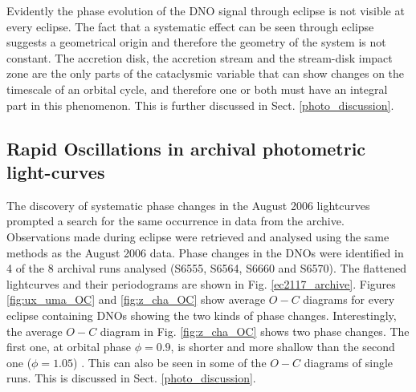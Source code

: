 
























Evidently the phase evolution of the DNO signal through eclipse is not visible at every eclipse. The fact that a systematic effect can be seen through eclipse suggests a geometrical origin and therefore the geometry of the system is not constant. The accretion disk, the accretion stream and the stream-disk impact zone are the only parts of the cataclysmic variable that can show changes on the timescale of an orbital cycle, and therefore one or both must have an integral part in this phenomenon. This is further discussed in Sect. \ref{photo_discussion}.



\subsection{Rapid Oscillations in archival photometric light-curves}
\label{ro_arc_phot_lc}

The discovery of systematic phase changes in the August 2006 lightcurves prompted a search for the same occurrence in data from the archive. Observations made during eclipse were retrieved and analysed using the same methods as the August 2006 data. Phase changes in the DNOs were identified in 4 of the 8 archival runs analysed (S6555, S6564, S6660 and S6570). The flattened lightcurves and their periodograms are shown in Fig. \ref{ec2117_archive}. Figures \ref{fig:ux_uma_OC} and \ref{fig:z_cha_OC} show average $O-C$ diagrams for every eclipse containing DNOs showing the two kinds of phase changes. Interestingly, the average $O-C$ diagram in Fig. \ref{fig:z_cha_OC} shows two phase changes. The first one, at orbital phase $\phi=0.9$, is shorter and more shallow than the second one ($\phi=1.05$) . This can also be seen in some of the $O-C$ diagrams of single runs. This is discussed in Sect. \ref{photo_discussion}.

